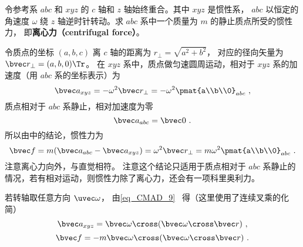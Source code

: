
令参考系 $abc$ 和 $xyz$ 的 $c$ 轴和 $z$ 轴始终重合。其中 $xyz$ 是惯性系， $abc$ 以恒定的角速度 $\omega$ 绕 $z$ 轴逆时针转动。求 $abc$ 系中一个质量为 $m$ 的静止质点所受的惯性力， 即\textbf{离心力（centrifugal force）}。

令质点的坐标 $(a,b,c)$ 离 $c$ 轴的距离为 $r_\bot = \sqrt{a^2 + b^2}$， 对应的径向矢量为 $\bvec r_\bot = (a,b,0)\Tr$。 在 $xyz$ 系中，质点做匀速圆周运动，相对于 $xyz$ 系的加速度（用 $abc$ 系的坐标表示）为
\begin{equation}
\bvec a_{xyz} =  - \omega ^2 \bvec r_\bot =  - \omega ^2 \pmat{a\\b\\0}_{abc}~,
\end{equation}
质点相对于 $abc$ 系静止，相对加速度为零
\begin{equation}
\bvec a_{abc} = \bvec 0~.
\end{equation}
所以由中的结论，惯性力为
\begin{equation}\label{eq_Centri_3}
\bvec f = m(\bvec a_{abc} - \bvec a_{xyz}) = \omega^2\bvec r_\bot = m\omega ^2\pmat{a\\b\\0}_{abc}~.
\end{equation}
注意离心力向外，与直觉相符。 注意这个结论只适用于质点相对于 $abc$ 系静止的情况，若有相对运动，则惯性力除了离心力，还会有一项科里奥利力。

若转轴取任意方向 $\uvec\omega$， 由\autoref{eq_CMAD_9}~ 得（这里使用了连续叉乘的化简）
\begin{equation}
\bvec a_{xyz} = \bvec\omega\cross (\bvec\omega\cross\bvec r)~,
\end{equation}
\begin{equation}\label{eq_Centri_5}
\bvec f = -m\bvec\omega\cross (\bvec\omega\cross\bvec r)~.
\end{equation}
